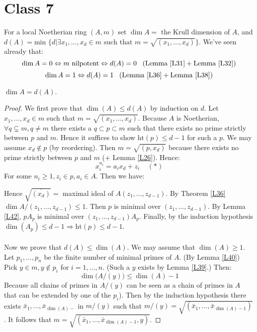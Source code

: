 \documentclass{../mathnotes}
\begin{document}
\section*{Class 7}
For a local Noetherian ring $(A,m)$ set $\dim A = $ the Krull dimension of $A$, and $d(A) = \text{min } \{d| \exists x_1, \dots, x_d \in m \text{ such that } m = \sqrt{(x_1, \dots, x_d)}\}$. We've seen already that:
\[        \dim A = 0 \Leftrightarrow m \text{ nilpotent} \Leftrightarrow d(A) = 0   \;\;\; (\text{Lemma } \ref{L31} + \text{Lemma } \ref{L32})  \]
\[       \dim A = 1 \Leftrightarrow d(A) = 1 \;\;\; (\text{Lemma } \ref{L36} + \text{Lemma } \ref{L38})    \]

\begin{thm} 
\label{L41}
$\dim A = d(A)$.
\end{thm}
\begin{proof}
We first prove that $\dim(A) \leq d(A)$ by induction on $d$. Let $x_1, \dots,x_d \in m$ such that $m = \sqrt{(x_1, \dots, x_d)}$. Because $A$ is Noetherian, $\forall q\subsetneq m, q\neq m$ there exists a $q\subset p \subset m$ such that there exists no prime strictly between $p$ and $m$. Hence it suffices to show $\text{ht}(p)\leq d-1$ for such a $p$. We may assume $x_d \not \in p$ (by reordering). Then $m = \sqrt{(p, x_d)}$ because there exists no prime strictly between $p$ and $m$ (+ Lemma \ref{L26}). Hence:
\[      x_i^{n_i} = a_i x_d + z_i \;\;\;\; (*)      \]
For some $n_i\geq 1, z_i \in p, a_i \in A$. Then we have:

Hence $\sqrt{\overline{(x_d)}} = $ maximal ideal of $A(z_1, \dots, z_{d-1})$. By Theorem \ref{L36} $\dim A/(z_1, \dots , z_{d-1}) \leq 1$. Then $p$ is minimal over $(z_1, \dots, z_{d-1})$. By Lemma \ref{L42}, $pA_p$ is minimal over $(z_1, \dots, z_{d-1})A_p$. Finally, by the induction hypothesis $\dim(A_p) \leq d-1 \Rightarrow \text{ht}(p) \leq d-1$.
\\
\\
Now we prove that $d(A) \leq \dim(A)$. We may assume that $\dim(A) \geq 1$. Let $p_1, \dots, p_n$ be the finite number of minimal primes of $A$. (By Lemma \ref{L40}) Pick $y\in m, y \not \in p_i$ for $i=1, \dots, n$. (Such a $y$ exists by Lemma \ref{L39}.) Then:
\[         \dim \big(A/(y)\big) \leq \dim(A) -1        \]
Because all chains of primes in $A/(y)$ can be seen as a chain of primes in $A$ that can be extended by one of the $p_i$). Then by the induction hypothesis there exists $\bar x_1 , \dots , \bar x_{\dim(A)-}$ in $m/(y)$ such that $m/(y) = \sqrt{(\bar x_1, \dots, \bar x_{\dim(A)-1})}$. It follows that $m = \sqrt{(\bar x_1, \dots, \bar x_{\dim(A)-1}, y)}$.
\end{proof}
\end{document}
